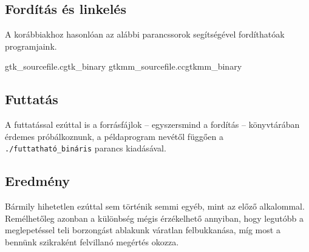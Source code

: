 \subsection{Fordítás és linkelés}

A korábbiakhoz hasonlóan az alábbi parancssorok segítségével fordíthatóak programjaink.

\lstcompiles
{gtk_sourcefile.c}{gtk_binary}
{gtkmm_sourcefile.cc}{gtkmm_binary}

\subsection{Futtatás}

A futtatással ezúttal is a forrásfájlok -- egyszersmind a fordítás -- könyvtárában érdemes próbálkoznunk, a példaprogram nevétől függően a \texttt{./futtatható\_bináris} parancs kiadásával.

\subsection{Eredmény}

Bármily hihetetlen ezúttal sem történik semmi egyéb, mint az előző alkalommal. Remélhetőleg azonban a különbség mégis érzékelhető annyiban, hogy legutóbb a meglepetéssel teli borzongást ablakunk váratlan felbukkanása, míg most a bennünk szikraként felvillanó megértés okozza.

